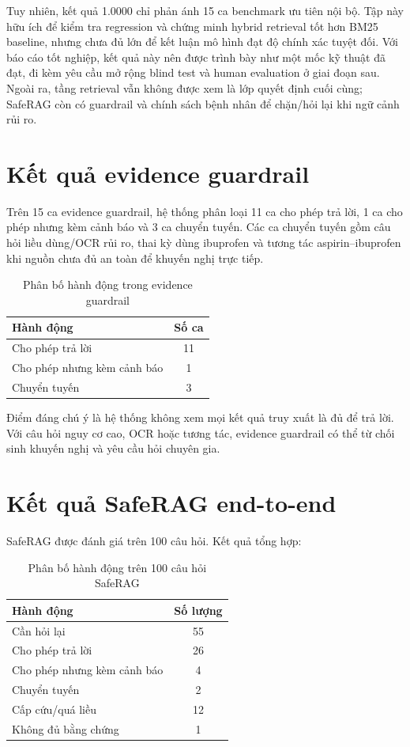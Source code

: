Tuy nhiên, kết quả 1.0000 chỉ phản ánh 15 ca benchmark ưu tiên nội bộ. Tập này hữu ích để kiểm tra regression và chứng minh hybrid retrieval tốt hơn BM25 baseline, nhưng chưa đủ lớn để kết luận mô hình đạt độ chính xác tuyệt đối. Với báo cáo tốt nghiệp, kết quả này nên được trình bày như một mốc kỹ thuật đã đạt, đi kèm yêu cầu mở rộng blind test và human evaluation ở giai đoạn sau. Ngoài ra, tầng retrieval vẫn không được xem là lớp quyết định cuối cùng; SafeRAG còn có guardrail và chính sách bệnh nhân để chặn/hỏi lại khi ngữ cảnh rủi ro.

\section{Kết quả evidence guardrail}

Trên 15 ca evidence guardrail, hệ thống phân loại 11 ca cho phép trả lời, 1 ca cho phép nhưng kèm cảnh báo và 3 ca chuyển tuyến. Các ca chuyển tuyến gồm câu hỏi liều dùng/OCR rủi ro, thai kỳ dùng ibuprofen và tương tác aspirin--ibuprofen khi nguồn chưa đủ an toàn để khuyến nghị trực tiếp.

\begin{table}[H]
\centering
\small
\caption{Phân bố hành động trong evidence guardrail}
\begin{tabularx}{0.75\linewidth}{Y C}
\toprule
\textbf{Hành động} & \textbf{Số ca} \\
\midrule
Cho phép trả lời & 11 \\
Cho phép nhưng kèm cảnh báo & 1 \\
Chuyển tuyến & 3 \\
\bottomrule
\end{tabularx}
\end{table}

Điểm đáng chú ý là hệ thống không xem mọi kết quả truy xuất là đủ để trả lời. Với câu hỏi nguy cơ cao, OCR hoặc tương tác, evidence guardrail có thể từ chối sinh khuyến nghị và yêu cầu hỏi chuyên gia.

\section{Kết quả SafeRAG end-to-end}

SafeRAG được đánh giá trên 100 câu hỏi. Kết quả tổng hợp:

\begin{table}[H]
\centering
\small
\caption{Phân bố hành động trên 100 câu hỏi SafeRAG}
\begin{tabularx}{0.85\linewidth}{Y C}
\toprule
\textbf{Hành động} & \textbf{Số lượng} \\
\midrule
Cần hỏi lại & 55 \\
Cho phép trả lời & 26 \\
Cho phép nhưng kèm cảnh báo & 4 \\
Chuyển tuyến & 2 \\
Cấp cứu/quá liều & 12 \\
Không đủ bằng chứng & 1 \\
\bottomrule
\end{tabularx}
\end{table}

